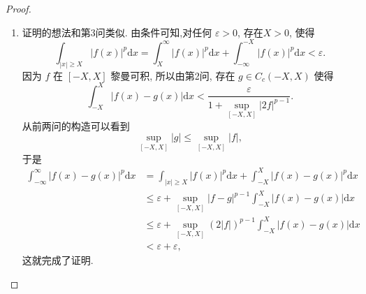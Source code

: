 \documentclass[../../main.tex]{subfiles}
\begin{document}
\begin{proof}
\begin{enumerate}[(1)]
\item 证明的想法和第3问类似. 由条件可知,对任何 $\varepsilon > 0$, 存在$X > 0$, 使得
\[
\int_{|x| \geqslant X} |f(x)|^{p}\mathrm{d}x=
\int_{X}^{\infty} |f(x)|^{p}\mathrm{d}x + \int_{-\infty}^{-X} |f(x)|^{p}\mathrm{d}x < \varepsilon.
\]
因为 $f$ 在 $[-X,X]$ 黎曼可积, 所以由第2问, 存在 $g \in C_c(-X,X)$ 使得
\[
\int_{-X}^{X} |f(x) - g(x)|\mathrm{d}x < \frac{\varepsilon}{1 + \sup_{[-X,X]} |2f|^{p - 1}}.
\]
从前两问的构造可以看到
\[
\sup_{[-X,X]} |g| \leqslant \sup_{[-X,X]} |f|,
\]
于是
\begin{align*}
\int_{-\infty}^{\infty} |f(x) - g(x)|^{p}\mathrm{d}x &= \int_{|x| \geqslant X} |f(x)|^{p}\mathrm{d}x + \int_{-X}^{X} |f(x) - g(x)|^{p}\mathrm{d}x \\
&\leqslant \varepsilon + \sup_{[-X,X]} |f - g|^{p - 1} \int_{-X}^{X} |f(x) - g(x)|\mathrm{d}x \\
&\leqslant \varepsilon + \sup_{[-X,X]} (2|f|)^{p - 1} \int_{-X}^{X} |f(x) - g(x)|\mathrm{d}x \\
&< \varepsilon + \varepsilon,
\end{align*}
这就完成了证明. 
\end{enumerate}

\end{proof}
\end{document}
